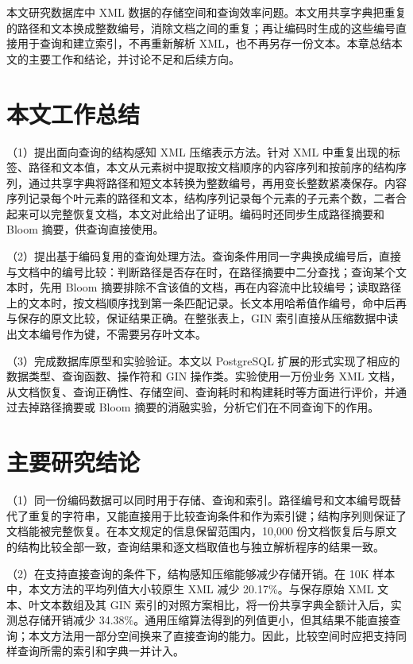 \summary

本文研究数据库中 XML 数据的存储空间和查询效率问题。本文用共享字典把重复的路径和文本换成整数编号，消除文档之间的重复；再让编码时生成的这些编号直接用于查询和建立索引，不再重新解析 XML，也不再另存一份文本。本章总结本文的主要工作和结论，并讨论不足和后续方向。

\section*{本文工作总结}

（1）提出面向查询的结构感知 XML 压缩表示方法。针对 XML 中重复出现的标签、路径和文本值，本文从元素树中提取按文档顺序的内容序列和按前序的结构序列，通过共享字典将路径和短文本转换为整数编号，再用变长整数紧凑保存。内容序列记录每个叶元素的路径和文本，结构序列记录每个元素的子元素个数，二者合起来可以完整恢复文档，本文对此给出了证明。编码时还同步生成路径摘要和 Bloom 摘要，供查询直接使用。

（2）提出基于编码复用的查询处理方法。查询条件用同一字典换成编号后，直接与文档中的编号比较：判断路径是否存在时，在路径摘要中二分查找；查询某个文本时，先用 Bloom 摘要排除不含该值的文档，再在内容流中比较编号；读取路径上的文本时，按文档顺序找到第一条匹配记录。长文本用哈希值作编号，命中后再与保存的原文比较，保证结果正确。在整张表上，GIN 索引直接从压缩数据中读出文本编号作为键，不需要另存叶文本。

（3）完成数据库原型和实验验证。本文以 PostgreSQL 扩展的形式实现了相应的数据类型、查询函数、操作符和 GIN 操作类。实验使用一万份业务 XML 文档，从文档恢复、查询正确性、存储空间、查询耗时和构建耗时等方面进行评价，并通过去掉路径摘要或 Bloom 摘要的消融实验，分析它们在不同查询下的作用。

\section*{主要研究结论}

（1）同一份编码数据可以同时用于存储、查询和索引。路径编号和文本编号既替代了重复的字符串，又能直接用于比较查询条件和作为索引键；结构序列则保证了文档能被完整恢复。在本文规定的信息保留范围内，10,000 份文档恢复后与原文的结构比较全部一致，查询结果和逐文档取值也与独立解析程序的结果一致。

（2）在支持直接查询的条件下，结构感知压缩能够减少存储开销。在 10K 样本中，本文方法的平均列值大小较原生 XML 减少 20.17\%。与保存原始 XML 文本、叶文本数组及其 GIN 索引的对照方案相比，将一份共享字典全额计入后，实测总存储开销减少 34.38\%。通用压缩算法得到的列值更小，但其结果不能直接查询；本文方法用一部分空间换来了直接查询的能力。因此，比较空间时应把支持同样查询所需的索引和字典一并计入。


